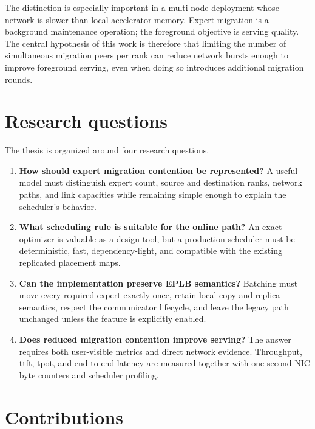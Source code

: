 The distinction is especially important in a multi-node deployment whose
network is slower than local accelerator memory. Expert migration is a
background maintenance operation; the foreground objective is serving quality.
The central hypothesis of this work is therefore that limiting the number of
simultaneous migration peers per rank can reduce network bursts enough to
improve foreground serving, even when doing so introduces additional migration
rounds.

\section{Research questions}

The thesis is organized around four research questions.

\begin{enumerate}[label=\textbf{RQ\arabic*:},leftmargin=2.2cm]
  \item \textbf{How should expert migration contention be represented?}
  A useful model must distinguish expert count, source and destination ranks,
  network paths, and link capacities while remaining simple enough to explain
  the scheduler's behavior.

  \item \textbf{What scheduling rule is suitable for the online path?}
  An exact optimizer is valuable as a design tool, but a production scheduler
  must be deterministic, fast, dependency-light, and compatible with the
  existing replicated placement maps.

  \item \textbf{Can the implementation preserve EPLB semantics?}
  Batching must move every required expert exactly once, retain local-copy and
  replica semantics, respect the communicator lifecycle, and leave the legacy
  path unchanged unless the feature is explicitly enabled.

  \item \textbf{Does reduced migration contention improve serving?}
  The answer requires both user-visible metrics and direct network evidence.
  Throughput, \gls{ttft}, \gls{tpot}, and end-to-end latency are measured
  together with one-second NIC byte counters and scheduler profiling.
\end{enumerate}

\section{Contributions}

